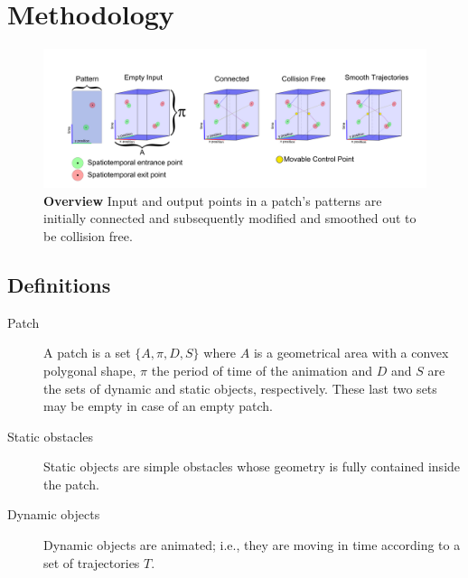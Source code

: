 \section{Methodology}
\label{sec:method}

\begin{figure}[t]
	\begin{center}
	\includegraphics[width=0.9\linewidth]{./images/overview-hd.png}
	\caption{
		\textbf{Overview} Input and output points in a patch's patterns are initially connected and subsequently modified and smoothed out to be collision free.
	}
	\label{fig:overview}
	\end{center}
\end{figure}


\subsection{Definitions}
\begin{description}

\item[Patch]{
A patch is a set $\{ A, \pi, D, S\}$ where $A$ is a geometrical area with a convex polygonal shape, $\pi$ the period of time of the animation and $D$ and $S$ are the sets of dynamic and static objects, respectively.
These last two sets may be empty in case of an empty patch.
}

\item[Static obstacles]{
Static objects are simple obstacles whose geometry is fully contained inside the patch.
}

\item[Dynamic objects]{
Dynamic objects are animated; i.e., they are moving in time according to a set of trajectories $T$.
}

\end{description}


